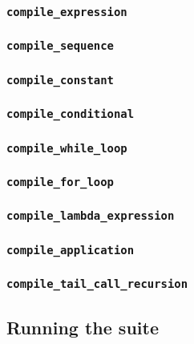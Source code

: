 \subsubsection{\texttt{compile\_expression}}

\subsubsection{\texttt{compile\_sequence}}

\subsubsection{\texttt{compile\_constant}}

\subsubsection{\texttt{compile\_conditional}}

\subsubsection{\texttt{compile\_while\_loop}}

\subsubsection{\texttt{compile\_for\_loop}}

\subsubsection{\texttt{compile\_lambda\_expression}}

\subsubsection{\texttt{compile\_application}}

\subsubsection{\texttt{compile\_tail\_call\_recursion}}

\subsection{Running the suite}

